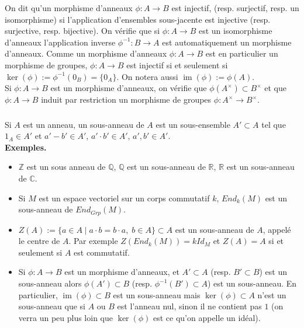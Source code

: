 \documentclass[a4paper, 12pt]{amsart}
\DeclareMathOperator{\im}{im}
\newcommand{\Q}{\mathbb{Q}}
\newcommand{\C}{\mathbb{C}}
\newcommand{\Z}{\mathbb{Z}}
\newcommand{\R}{\mathbb{R}}
\begin{document}
\noindent On dit qu'un morphisme d'anneaux $\phi:A\rightarrow B$ est injectif, (resp. surjectif, resp. un isomorphisme) si l'application d'ensembles sous-jacente est injective (resp. surjective, resp. bijective). On vérifie que si $\phi:A\rightarrow B$ est un isomorphisme d'anneaux l'application inverse $\phi^{-1}:B\rightarrow A$ est automatiquement un morphisme d'anneaux. Comme un morphisme d'anneaux $\phi:A\rightarrow B$ est en particulier un morphisme de groupes, $\phi:A\rightarrow B$ est injectif si et seulement si $\ker(\phi):=\phi^{-1}(0_B)=\lbrace 0_A\rbrace$. On notera aussi $\im(\phi):=\phi(A)$. \\

\noindent Si $\phi:A\rightarrow B$ est un morphisme d'anneaux, on vérifie que $\phi(A^\times)\subset B^\times$ et que $\phi:A\rightarrow B$ induit par restriction un morphisme de groupes $\phi:A^\times\rightarrow B^\times$.

\subsubsection{}Si $A$ est un anneau, un sous-anneau de $A$ est un sous-ensemble $A'\subset A$ tel que $1_A\in A'$ et $a'-b'\in A'$, $a'\cdot b'\in A'$, $a',b'\in A'$. \\

\noindent\textbf{Exemples.}
\begin{itemize}[leftmargin=* ,parsep=0cm,itemsep=0cm,topsep=0cm]
\item $\Z$ est un sous anneau de $\Q$, $\Q$ est un sous-anneau de $\R$, $\R$ est un sous-anneau de $\C$. 
\item Si $M$ est un espace vectoriel sur un corps commutatif $k$, $End_k(M)$ est un sous-anneau de $End_{Grp}(M)$. 
\item $Z(A):=\lbrace a\in A\;|\; a\cdot b=b\cdot a,\; b\in A\rbrace\subset A$ est un sous-anneau de $A$, appelé le centre de $A$. Par exemple $Z(End_k(M))=kId_M$ et $Z(A)=A$ si et seulement si $A$ est commutatif. 
\item Si $\phi:A\rightarrow B$ est un morphisme d'anneaux, et $A'\subset A$ (resp. $B'\subset B$) est un sous-anneau alors $\phi(A')\subset B$ (resp. $\phi^{-1}(B')\subset A$) est un sous-anneau. En particulier, $\im(\phi)\subset B$ est un sous-anneau mais  $\ker(\phi)\subset A$ n'est un sous-anneau que si $A$ ou $B$ est l'anneau nul, sinon il ne contient pas $1$ (on verra un peu plus loin que $\ker(\phi)$ est ce qu'on appelle un idéal).
\end{itemize}
\end{document}
